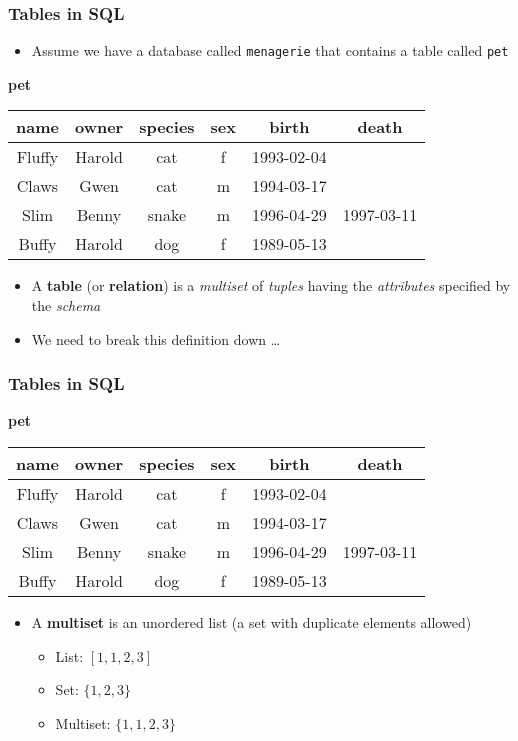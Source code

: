 \documentclass[hyperref={pdfpagelabels=false},svgnames,xcolor=table]{beamer}
\begin{document}
\begin{frame}[fragile]
  \frametitle{Tables in SQL}
  \begin{itemize}
    \item Assume we have a database called \verb'menagerie' that contains
      a table called \verb'pet'
  \end{itemize}
  \textbf{pet} \\
  \begin{tabular}{|c|c|c|c|c|c|}
    \hline
    \textbf{name} & \textbf{owner} & \textbf{species} & \textbf{sex} & \textbf{birth} & \textbf{death} \\
    \hline
    Fluffy & Harold & cat & f & 1993-02-04 & \\
    \hline
    Claws & Gwen & cat & m & 1994-03-17 & \\
    \hline
    Slim & Benny & snake & m & 1996-04-29 & 1997-03-11 \\
    \hline
    Buffy & Harold & dog & f & 1989-05-13 & \\
    \hline
  \end{tabular}
  \bigskip
  \begin{itemize}
    \item A \textbf{table} (or \textbf{relation}) is a \emph{multiset} of
      \emph{tuples} having the \emph{attributes} specified by the
      \emph{schema}
    \item We need to break this definition down \ldots
  \end{itemize}
\end{frame}

\begin{frame}
  \frametitle{Tables in SQL}
  \textbf{pet} \\
  \begin{tabular}{|c|c|c|c|c|c|}
    \hline
    \textbf{name} & \textbf{owner} & \textbf{species} & \textbf{sex} & \textbf{birth} & \textbf{death} \\
    \hline
    Fluffy & Harold & cat & f & 1993-02-04 & \\
    \hline
    Claws & Gwen & cat & m & 1994-03-17 & \\
    \hline
    Slim & Benny & snake & m & 1996-04-29 & 1997-03-11 \\
    \hline
    Buffy & Harold & dog & f & 1989-05-13 & \\
    \hline
  \end{tabular}
  \bigskip
  \begin{itemize}
  \item A \textbf{multiset} is an unordered list (a set with duplicate elements
    allowed)
      \begin{itemize}
        \item List: $[1, 1, 2, 3]$
        \item Set: $\{1, 2, 3\}$
        \item Multiset: $\{1, 1, 2, 3\}$
      \end{itemize}
  \end{itemize}
\end{frame}
\end{document}
